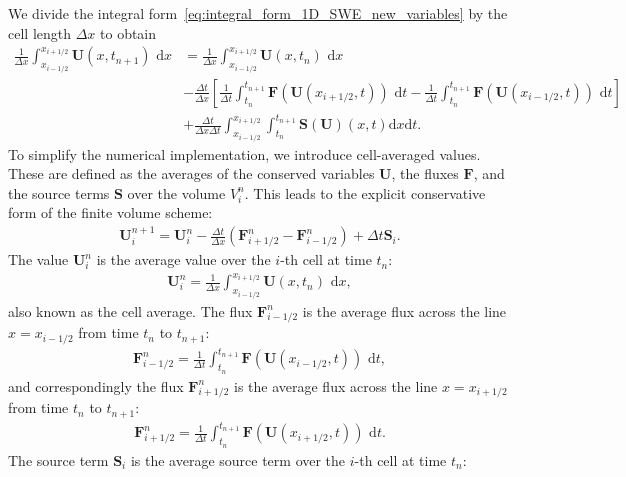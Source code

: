 We divide the integral form~\eqref{eq:integral_form_1D_SWE_new_variables} by the cell length $\Delta x$ to obtain
\begin{align*}
    \frac{1}{\Delta x} \int_{x_{i-1/2}}^{x_{i+1/2}} \mathbf{U}(x,t_{n+1}) \text{ d}x &= \frac{1}{\Delta x} \int_{x_{i-1/2}}^{x_{i+1/2}} \mathbf{U}(x,t_n) \text{ d}x\\
    & - \frac{\Delta t}{\Delta x} \left[ \frac{1}{\Delta t} \int_{t_n}^{t_{n+1}} \mathbf{F}(\mathbf{U}(x_{i+1/2}, t)) \text{ d}t
    - \frac{1}{\Delta t} \int_{t_n}^{t_{n+1}} \mathbf{F}(\mathbf{U}(x_{i-1/2}, t)) \text{ d}t \right] \\
    &+ \frac{\Delta t}{\Delta x \Delta t} \int_{x_{i-1/2}}^{x_{i+1/2}} \int_{t_n}^{t_{n+1}} \mathbf{S(U)}(x,t) \text{d}x \text{d}t.
\end{align*}
To simplify the numerical implementation, we introduce cell-averaged values.
These are defined as the averages of the conserved variables $\mathbf{U}$, the fluxes $\mathbf{F}$, and the source terms $\mathbf{S}$ over the volume $V_i^n$.
This leads to the explicit conservative form of the finite volume scheme:
\begin{align}\label{eq:explicit_conservative_1D_SWE}
    \mathbf{U}_i^{n+1} = \mathbf{U}_i^n - \frac{\Delta t}{\Delta x} \left( \mathbf{F}_{i+1/2}^n - \mathbf{F}_{i-1/2}^n \right) + \Delta t \mathbf{S}_i.
\end{align}
The value $\mathbf{U}_i^n$ is the average value over the $i$-th cell at time $t_n$:
\begin{align*}
    \mathbf{U}_i^n = \frac{1}{\Delta x} \int_{x_{i-1/2}}^{x_{i+1/2}} \mathbf{U}(x,t_n) \text{ d}x,
\end{align*}
also known as the cell average.
The flux $\mathbf{F}_{i-1/2}^n$ is the average flux across the line $x = x_{i-1/2}$ from time $t_n$ to $t_{n+1}$:
\begin{align*}
    \mathbf{F}_{i-1/2}^n = \frac{1}{\Delta t} \int_{t_n}^{t_{n+1}} \mathbf{F}(\mathbf{U}(x_{i-1/2},t)) \text{ d}t,
\end{align*}
and correspondingly the flux $\mathbf{F}_{i+1/2}^n$ is the average flux across the line $x = x_{i+1/2}$ from time $t_n$ to $t_{n+1}$:
\begin{align*}
    \mathbf{F}_{i+1/2}^n = \frac{1}{\Delta t} \int_{t_n}^{t_{n+1}} \mathbf{F}(\mathbf{U}(x_{i+1/2},t)) \text{ d}t.
\end{align*}
The source term $\mathbf{S}_i$ is the average source term over the $i$-th cell at time $t_n$:

